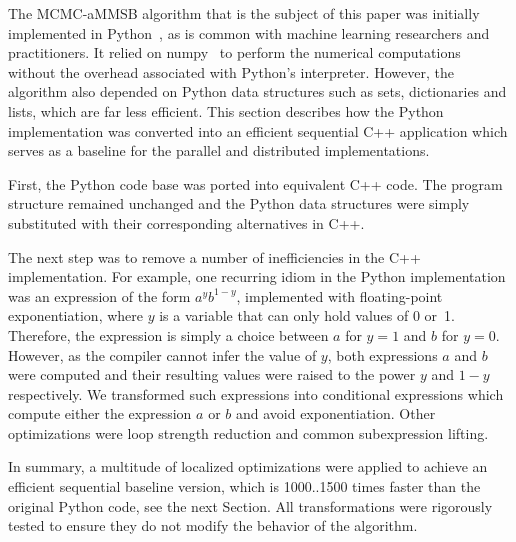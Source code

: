 The MCMC-aMMSB algorithm that is the subject of this paper was initially
implemented in Python~\cite{LiAW15}, as is common
with machine learning researchers and practitioners. It
relied on numpy~\cite{numpy} to perform the numerical computations without the
overhead associated with Python's interpreter. However, the algorithm also
depended on Python data structures such as sets, dictionaries and
lists, which are far less efficient.
This section describes how the Python implementation was
converted into an efficient sequential C++ application which serves as a
baseline for the parallel and distributed implementations.

First, the Python code base was ported into equivalent C++ code.
The program structure remained unchanged and the Python data structures were
simply substituted with their corresponding alternatives in C++.

The next step was to remove a number of inefficiencies in the C++
implementation. For example, one recurring idiom in the Python implementation
was an expression of the form $a^y b^{1-y}$, implemented with floating-point
exponentiation, where $y$ is a variable that can
only hold values of 0 or~1. Therefore, the expression is simply a choice
between $a$ for $y=1$ and $b$ for $y=0$. However, as the compiler cannot infer
the value of $y$, both expressions $a$ and $b$ were computed and their
resulting values were raised to the power $y$ and $1-y$ respectively.
We transformed such expressions into conditional expressions which
compute either the expression $a$ or $b$ and avoid exponentiation.
%
Other optimizations were loop strength
reduction and common subexpression lifting.

In summary, a multitude of localized optimizations were applied to achieve
an efficient sequential baseline version, which is 1000..1500 times faster
than the original Python code, see the next Section.
All transformations were rigorously tested to ensure they do
not modify the behavior of the algorithm.

\begin{comment}
Further, we replaced calls to the system's random
functions with a custom implementation of the random generator
\textit{xorshift\_128}~\cite{Marsaglia:2003:XR}. This way, random calls no longer
involve system calls, so we can support easy and fast multi-threaded random
calls by providing each thread with its private, differently seeded, random
generator.
\end{comment}
